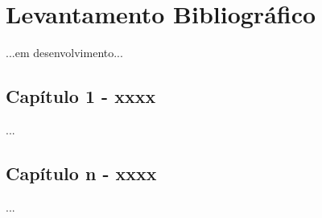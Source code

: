 \chapter{Levantamento Bibliográfico}
...em desenvolvimento...

\section{Capítulo 1 - xxxx}
...

\section{Capítulo n - xxxx}
...